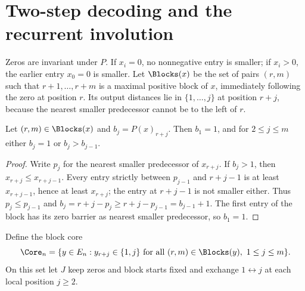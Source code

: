 \section{Two-step decoding and the recurrent involution}
Zeros are invariant under $P$. If $x_i=0$, no nonnegative entry is smaller;
if $x_i>0$, the earlier entry $x_0=0$ is smaller. Let $\Blocks(x)$ be
the set of pairs $(r,m)$ such that $r+1,\ldots,r+m$ is a maximal positive
block of $x$, immediately following the zero at position $r$.
Its output distances lie in $\{1,\ldots,j\}$ at position $r+j$, because
the nearest smaller predecessor cannot be to the left of $r$.

\begin{lemma}\label{lem:rise}
Let $(r,m)\in\Blocks(x)$ and $b_j=P(x)_{r+j}$. Then $b_1=1$, and for
$2\le j\le m$ either $b_j=1$ or $b_j>b_{j-1}$.
\end{lemma}
\begin{proof}
Write $p_j$ for the nearest smaller predecessor of $x_{r+j}$.
If $b_j>1$, then $x_{r+j}\le x_{r+j-1}$. Every entry strictly between
$p_{j-1}$ and $r+j-1$ is at least $x_{r+j-1}$, hence at least $x_{r+j}$;
the entry at $r+j-1$ is not smaller either. Thus $p_j\le p_{j-1}$ and
$b_j=r+j-p_j\ge r+j-p_{j-1}=b_{j-1}+1$.
The first entry of the block has its zero barrier as nearest smaller
predecessor, so $b_1=1$.
\end{proof}

Define the block core
\begin{equation}\label{eq:core}
 \Core_n=\{y\in E_n:y_{r+j}\in\{1,j\}
       \text{ for all }(r,m)\in\Blocks(y),\ 1\le j\le m\}.
\end{equation}
On this set let $J$ keep zeros and block starts fixed and exchange
$1\leftrightarrow j$ at each local position $j\ge2$.

